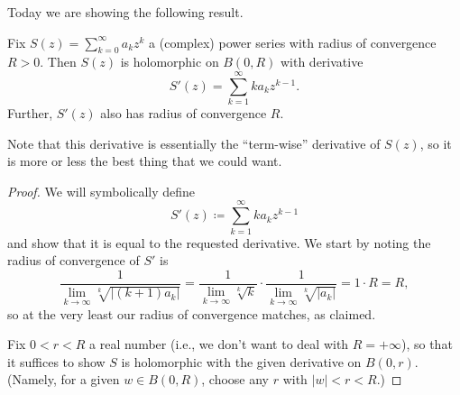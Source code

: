 \documentclass[../notes.tex]{subfiles}
\begin{document}
Today we are showing the following result.
\begin{proposition} \label{prop:powerseriesholo}
	Fix $S(z)=\sum_{k=0}^\infty a_kz^k$ a (complex) power series with radius of convergence $R>0$. Then $S(z)$ is holomorphic on $B(0,R)$ with derivative
	\[S'(z)=\sum_{k=1}^\infty ka_kz^{k-1}.\]
	Further, $S'(z)$ also has radius of convergence $R$.
\end{proposition}
Note that this derivative is essentially the ``term-wise'' derivative of $S(z)$, so it is more or less the best thing that we could want.
\begin{proof}
	We will symbolically define
	\[S'(z)\coloneqq \sum_{k=1}^\infty ka_kz^{k-1}\]
	and show that it is equal to the requested derivative. We start by noting the radius of convergence of $S'$ is
	\[\frac1{\lim_{k\to\infty}\sqrt[k]{|(k+1)a_k|}}=\frac1{\lim_{k\to\infty}\sqrt[k]k}\cdot\frac1{\lim_{k\to\infty}\sqrt[k]{|a_k|}}=1\cdot R=R,\]
	so at the very least our radius of convergence matches, as claimed.
	
	Fix $0<r<R$ a real number (i.e., we don't want to deal with $R=+\infty$), so that it suffices to show $S$ is holomorphic with the given derivative on $B(0,r)$. (Namely, for a given $w\in B(0,R)$, choose any $r$ with $|w|<r<R$.)
	

\end{proof}
\end{document}

